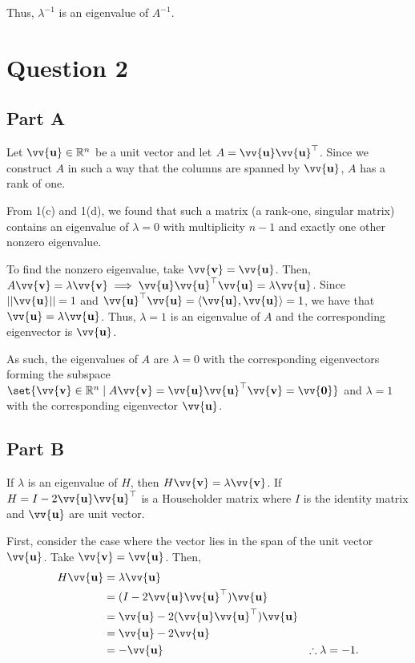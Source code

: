 \documentclass[12pt]{article}
\newcommand{\vect}[1]{\vv{\mathbf{#1}}}
\newcommand{\R}{\mathbb{R}}
\begin{document}
Thus, $\lambda^{-1}$ is an eigenvalue of $A^{-1}$.

\section*{Question 2}

\subsection*{Part A}

Let $\vect{u}\in\R^n$ be a unit vector and let $A=\vect{u}\vect{u}^\top$. Since we construct $A$ in such a way that the columns are spanned by $\vect{u}$, $A$ has a rank of one.

From 1(c) and 1(d), we found that such a matrix (a rank-one, singular matrix) contains an eigenvalue of $\lambda=0$ with multiplicity $n-1$ and exactly one other nonzero eigenvalue.

To find the nonzero eigenvalue, take $\vect{v}=\vect{u}$. Then, $A\vect{v} = \lambda\vect{v} \implies \vect{u}\vect{u}^\top\vect{u} = \lambda\vect{u}$. Since $||\vect{u}||=1$ and $\vect{u}^\top\vect{u}=\langle\vect{u},\vect{u}\rangle=1$, we have that $\vect{u}=\lambda\vect{u}$. Thus, $\lambda=1$ is an eigenvalue of $A$ and the corresponding eigenvector is $\vect{u}$.

As such, the eigenvalues of $A$ are $\lambda=0$ with the corresponding eigenvectors forming the subspace $\set{\vect{v}\in\R^n\mid A\vect{v}=\vect{u}\vect{u}^\top\vect{v}=\vect{0}}$ and $\lambda=1$ with the corresponding eigenvector $\vect{u}$.

\subsection*{Part B}

If $\lambda$ is an eigenvalue of $H$, then $H\vect{v}=\lambda\vect{v}$. If $H=I-2\vect{u}\vect{u}^\top$ is a Householder matrix where $I$ is the identity matrix and $\vect{u}$ are unit vector.

First, consider the case where the vector lies in the span of the unit vector $\vect{u}$. Take $\vect{v}=\vect{u}$. Then,
\begin{align*}
    H\vect{u} &= \lambda\vect{u} \\
    &= (I-2\vect{u}\vect{u}^\top)\vect{u} \\
    &= \vect{u} - 2(\vect{u}\vect{u}^\top)\vect{u} \\
    &= \vect{u} - 2\vect{u} \\
    &= -\vect{u} &\therefore\lambda=-1.
\end{align*}
\end{document}
